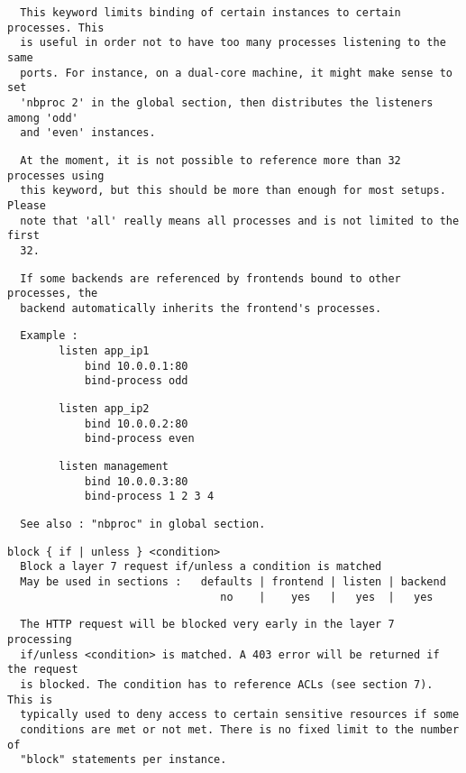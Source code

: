 \begin{verbatim}
  This keyword limits binding of certain instances to certain processes. This
  is useful in order not to have too many processes listening to the same
  ports. For instance, on a dual-core machine, it might make sense to set
  'nbproc 2' in the global section, then distributes the listeners among 'odd'
  and 'even' instances.
\end{verbatim}

\begin{verbatim}
  At the moment, it is not possible to reference more than 32 processes using
  this keyword, but this should be more than enough for most setups. Please
  note that 'all' really means all processes and is not limited to the first
  32.
\end{verbatim}

\begin{verbatim}
  If some backends are referenced by frontends bound to other processes, the
  backend automatically inherits the frontend's processes.
\end{verbatim}

\begin{verbatim}
  Example :
        listen app_ip1
            bind 10.0.0.1:80
            bind-process odd
\end{verbatim}

\begin{verbatim}
        listen app_ip2
            bind 10.0.0.2:80
            bind-process even
\end{verbatim}

\begin{verbatim}
        listen management
            bind 10.0.0.3:80
            bind-process 1 2 3 4
\end{verbatim}

\begin{verbatim}
  See also : "nbproc" in global section.
\end{verbatim}

\begin{verbatim}
block { if | unless } <condition>
  Block a layer 7 request if/unless a condition is matched
  May be used in sections :   defaults | frontend | listen | backend
                                 no    |    yes   |   yes  |   yes
\end{verbatim}

\begin{verbatim}
  The HTTP request will be blocked very early in the layer 7 processing
  if/unless <condition> is matched. A 403 error will be returned if the request
  is blocked. The condition has to reference ACLs (see section 7). This is
  typically used to deny access to certain sensitive resources if some
  conditions are met or not met. There is no fixed limit to the number of
  "block" statements per instance.
\end{verbatim}

